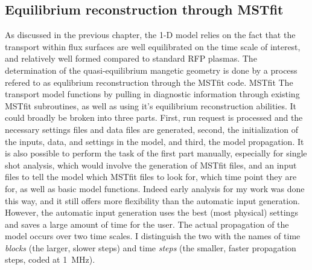 \subsection{Equilibrium reconstruction through MSTfit}\label{sec:MSTfit}


As discussed in the previous chapter, the 1-D model relies on the fact that the transport within flux surfaces are  well equilibrated on the time scale of interest, and relatively well formed compared to standard RFP plasmas. The determination of the quasi-equilibrium mangetic geometry is done by a process refered to as equlibrium reconstruction through the MSTfit code. MSTfit
The transport model functions by pulling in diagnostic information through existing MSTfit\cite{Anderson2004EquilibriumPinch} subroutines, as well as using it's equilibrium reconstruction abilities.  It could broadly be broken into three parts. First, run request is processed and the necessary settings files and data files are generated, second, the initialization of the inputs, data, and settings in the model, and third, the model propagation. It is also possible to perform the task of the first part manually, especially for single shot analysis, which would involve the generation of MSTfit files, and an input files to tell the model which MSTfit files to look for, which time point they are for, as well as basic model functions. Indeed early analysis for my work was done this way, and it still offers more flexibility than the automatic input generation. However, the automatic input generation uses the best (most physical) settings and saves a large amount of time for the user. The actual propagation of the model occurs over two time scales. I distinguish the two with the names of time \textit{blocks} (the larger, slower steps) and time \textit{steps} (the smaller, faster propagation steps, coded at 1~MHz). 
